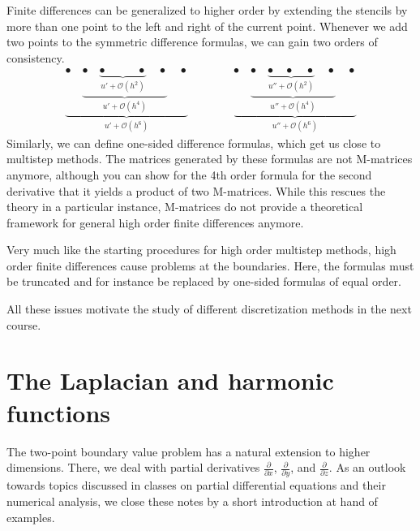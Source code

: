 \begin{remark}
  Finite differences can be generalized to higher order by extending
  the stencils by more than one point to the left and right of the
  current point. Whenever we add two points to the symmetric
  difference formulas, we can gain two orders of consistency.
  \begin{gather*}
    \underbrace{\bullet\quad
      \underbrace{\bullet\quad
        \underbrace{\bullet\quad\phantom{\bullet}\quad\bullet}_{u'+\mathcal O(h^2)}
        \quad\bullet}_{u'+\mathcal O(h^4)}
      \quad\bullet}_{u'+\mathcal O(h^6)}
    \qquad\qquad
    \underbrace{\bullet\quad
      \underbrace{\bullet\quad
        \underbrace{\bullet\quad\bullet\quad\bullet}_{u''+\mathcal O(h^2)}
        \quad\bullet}_{u''+\mathcal O(h^4)}
      \quad\bullet}_{u''+\mathcal O(h^6)}
  \end{gather*}
  Similarly, we can define one-sided difference formulas, which get us
  close to multistep methods. The matrices generated by these formulas
  are not M-matrices anymore, although you can show for the 4th order
  formula for the second derivative that it yields a product of two
  M-matrices. While this rescues the theory in a particular instance,
  M-matrices do not provide a theoretical framework for general high
  order finite differences anymore.

  Very much like the starting procedures for high order multistep
  methods, high order finite differences cause problems at the
  boundaries. Here, the formulas must be truncated and for instance be
  replaced by one-sided formulas of equal order.
  
  All these issues motivate the study of different discretization
  methods in the next course.
\end{remark}

\section{The Laplacian and harmonic functions}

\begin{intro}
  The two-point boundary value problem has a natural extension to
  higher dimensions. There, we deal with partial derivatives
  $\frac{\partial}{\partial x}$, $\frac{\partial}{\partial y}$, and
  $\frac{\partial}{\partial z}$. As an outlook towards topics
  discussed in classes on partial differential equations and their
  numerical analysis, we close these notes by a short introduction at
  hand of examples.
\end{intro}


